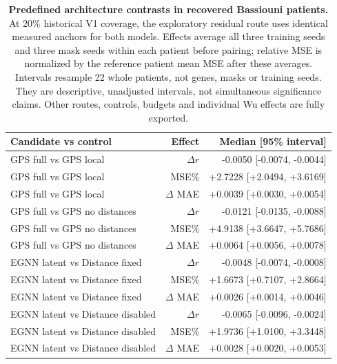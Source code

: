 \begin{table}[!htbp]
\caption{\textbf{Predefined architecture contrasts in recovered Bassiouni patients.} At 20\% historical V1 coverage, the exploratory residual route uses identical measured anchors for both models. Effects average all three training seeds and three mask seeds within each patient before pairing; relative MSE is normalized by the reference patient mean MSE after these averages. Intervals resample 22 whole patients, not genes, masks or training seeds. They are descriptive, unadjusted intervals, not simultaneous significance claims. Other routes, controls, budgets and individual Wu effects are fully exported.}
\label{tab:extension_controls}
\centering\footnotesize
\begin{tabular}{@{}lrr@{}}
\toprule
Candidate vs control & Effect & Median [95\% interval] \\
\midrule
GPS full vs GPS local & $\Delta r$ & -0.0050 [-0.0074, -0.0044] \\
GPS full vs GPS local & MSE\% & +2.7228 [+2.0494, +3.6169] \\
GPS full vs GPS local & $\Delta$ MAE & +0.0039 [+0.0030, +0.0054] \\
GPS full vs GPS no distances & $\Delta r$ & -0.0121 [-0.0135, -0.0088] \\
GPS full vs GPS no distances & MSE\% & +4.9138 [+3.6647, +5.7686] \\
GPS full vs GPS no distances & $\Delta$ MAE & +0.0064 [+0.0056, +0.0078] \\
EGNN latent vs Distance fixed & $\Delta r$ & -0.0048 [-0.0074, -0.0008] \\
EGNN latent vs Distance fixed & MSE\% & +1.6673 [+0.7107, +2.8664] \\
EGNN latent vs Distance fixed & $\Delta$ MAE & +0.0026 [+0.0014, +0.0046] \\
EGNN latent vs Distance disabled & $\Delta r$ & -0.0065 [-0.0096, -0.0024] \\
EGNN latent vs Distance disabled & MSE\% & +1.9736 [+1.0100, +3.3448] \\
EGNN latent vs Distance disabled & $\Delta$ MAE & +0.0028 [+0.0020, +0.0053] \\
\bottomrule
\end{tabular}
\end{table}
\FloatBarrier
